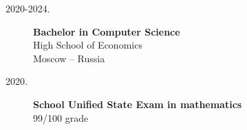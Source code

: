 \documentclass[a4paper,10pt]{article}
\begin{document}
\begin{adjustbox}{valign=t}
\begin{minipage}{0.3\textwidth}
\begin{description}
	\item [\normalfont \textcolor{ColorOne}{2020-2024.}] \textbf{Bachelor in Computer Science}\\
	High School of Economics\\
	Moscow -- Russia

	\item [\normalfont \textcolor{ColorOne}{2020.}] \textbf{School Unified State Exam in mathematics}\\ 
	99/100 grade
\end{description}

\vfill
\end{minipage}
\end{adjustbox}
%
%
%
\hfill
\begin{adjustbox}{valign=t}
\begin{minipage}{0.05\textwidth} %
\MyVerticalRule  %
\end{minipage}
\end{adjustbox}
\hfill
%
\end{document}

